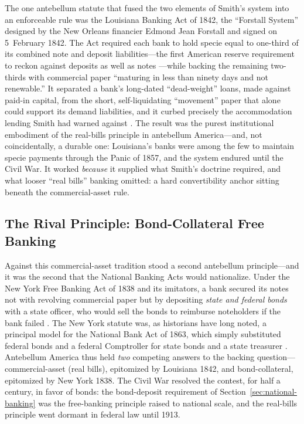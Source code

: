 \documentclass[12pt]{article}
\begin{document}
The one antebellum statute that fused the two elements of Smith's system into an
enforceable rule was the Louisiana Banking Act of 1842, the ``Forstall System''
designed by the New Orleans financier Edmond Jean Forstall and signed on
5~February 1842.  The Act required each bank to hold specie equal to one-third of
its combined note and deposit liabilities---the first American reserve requirement
to reckon against deposits as well as notes \citep{carlson2013reserve}---while
backing the remaining two-thirds with commercial paper ``maturing in less than
ninety days and not renewable.''  It separated a bank's long-dated
``dead-weight'' loans, made against paid-in capital, from the short,
self-liquidating ``movement'' paper that alone could support its demand
liabilities, and it curbed precisely the accommodation lending Smith had warned
against \citep{green1969louisianaact, neu1969forstall}.  The result was the purest
institutional embodiment of the real-bills principle in antebellum America---and,
not coincidentally, a durable one: Louisiana's banks were among the few to
maintain specie payments through the Panic of 1857, and the system endured until
the Civil War.  It worked \emph{because} it supplied what Smith's doctrine
required, and what looser ``real bills'' banking omitted: a hard convertibility
anchor sitting beneath the commercial-asset rule.

\subsection{The Rival Principle: Bond-Collateral Free Banking}

Against this commercial-asset tradition stood a second antebellum principle---and
it was the second that the National Banking Acts would nationalize.  Under the New
York Free Banking Act of 1838 and its imitators, a bank secured its notes not with
revolving commercial paper but by depositing \emph{state and federal bonds} with a
state officer, who would sell the bonds to reimburse noteholders if the bank
failed \citep{bodenhorn2000history}.  The New York statute was, as historians have
long noted, a principal model for the National Bank Act of 1863, which simply
substituted federal bonds and a federal Comptroller for state bonds and a state
treasurer \citep{rockoff1974free}.  Antebellum America thus held \emph{two}
competing answers to the backing question---commercial-asset (real bills),
epitomized by Louisiana 1842, and bond-collateral, epitomized by New York
1838.  The Civil War resolved the contest, for half a century, in favor of bonds:
the bond-deposit requirement of Section~\ref{sec:national-banking} was the
free-banking principle raised to national scale, and the real-bills principle went
dormant in federal law until 1913.
\end{document}
